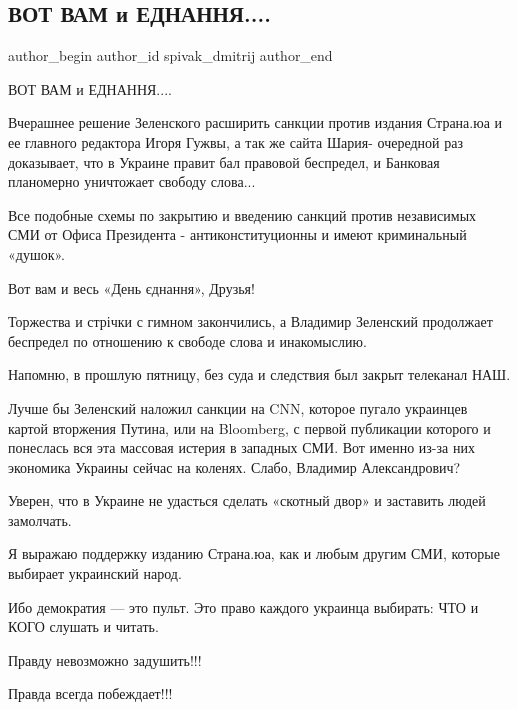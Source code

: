  
 
 
 
 
 
\subsection{ВОТ ВАМ и ЕДНАННЯ....}
\label{sec:18_02_2022.fb.spivak_dmitrij.1.vot_vam_i_jednannja}
 
\ifcmt
 author_begin
   author_id spivak_dmitrij
 author_end
\fi

ВОТ ВАМ и ЕДНАННЯ....

Вчерашнее решение Зеленского расширить санкции против издания Страна.юа и ее
главного редактора Игоря Гужвы, а так же сайта Шария- очередной раз доказывает,
что в Украине правит бал правовой беспредел, и Банковая планомерно уничтожает
свободу слова... 

Все подобные схемы по закрытию и введению санкций против независимых СМИ от
Офиса Президента - антиконституционны и имеют криминальный «душок». 

Вот вам и весь «День єднання», Друзья! 

Торжества и стрічки с гимном закончились, а Владимир Зеленский продолжает
беспредел по отношению к свободе слова и инакомыслию. 

Напомню, в прошлую пятницу, без суда и следствия  был закрыт телеканал НАШ. 

Лучше бы Зеленский наложил санкции на CNN,  которое пугало украинцев картой
вторжения Путина, или на Bloomberg, с первой публикации которого и понеслась
вся эта массовая истерия в западных СМИ. Вот именно из-за них экономика Украины
сейчас на коленях. Слабо, Владимир Александрович? 

Уверен, что в Украине не удасться сделать «скотный двор» и заставить людей
замолчать. 

Я выражаю поддержку изданию Страна.юа, как и любым другим СМИ, которые выбирает
украинский народ. 

Ибо демократия — это пульт. Это право каждого украинца выбирать: ЧТО и КОГО
слушать и читать.

Правду невозможно задушить!!! 

Правда всегда побеждает!!!
